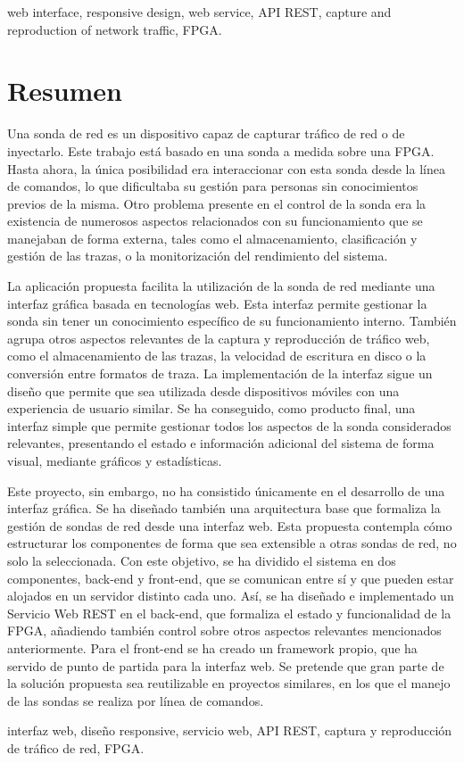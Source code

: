 \begin{keywordsEn}
web interface, responsive design, web service, API REST, capture and reproduction of network traffic, FPGA.
\end{keywordsEn}

\chapter*{Resumen}

\begin{abstractEs}

Una sonda de red es un dispositivo capaz de capturar tráfico de red o de inyectarlo.
Este trabajo está basado en una sonda a medida sobre una FPGA.
Hasta ahora, la única posibilidad era interaccionar con esta sonda desde la línea de comandos, lo que dificultaba su gestión para personas sin conocimientos previos de la misma.
Otro problema presente en el control de la sonda era la existencia de numerosos aspectos relacionados con su funcionamiento que se manejaban de forma externa, tales como el almacenamiento, clasificación y gestión de las trazas, o la monitorización del rendimiento del sistema.

La aplicación propuesta facilita la utilización de la sonda de red mediante una interfaz gráfica basada en tecnologías web.
Esta interfaz permite gestionar la sonda sin tener un conocimiento específico de su funcionamiento interno.
También agrupa otros aspectos relevantes de la captura y reproducción de tráfico web, como el almacenamiento de las trazas, la velocidad de escritura en disco o la conversión entre formatos de traza.
La implementación de la interfaz sigue un diseño que permite que sea utilizada desde dispositivos móviles con una experiencia de usuario similar.
Se ha conseguido, como producto final, una interfaz simple que permite gestionar todos los aspectos de la sonda considerados relevantes, presentando el estado e información adicional del sistema de forma visual, mediante gráficos y estadísticas.

Este proyecto, sin embargo, no ha consistido únicamente en el desarrollo de una interfaz gráfica.
Se ha diseñado también una arquitectura base que formaliza la gestión de sondas de red desde una interfaz web.
Esta propuesta contempla cómo estructurar los componentes de forma que sea extensible a otras sondas de red, no solo la seleccionada.
Con este objetivo, se ha dividido el sistema en dos componentes, back-end y front-end, que se comunican entre sí y que pueden estar alojados en un servidor distinto cada uno.
Así, se ha diseñado e implementado un Servicio Web REST en el back-end, que formaliza el estado y funcionalidad de la FPGA, añadiendo también control sobre otros aspectos relevantes mencionados anteriormente.
Para el front-end se ha creado un framework propio, que ha servido de punto de partida para la interfaz web.
Se pretende que gran parte de la solución propuesta sea reutilizable en proyectos similares, en los que el manejo de las sondas se realiza por línea de comandos.

\end{abstractEs}

\begin{keywordsEs}
interfaz web, diseño responsive, servicio web, API REST, captura y reproducción de tráfico de red, FPGA.
\end{keywordsEs}
